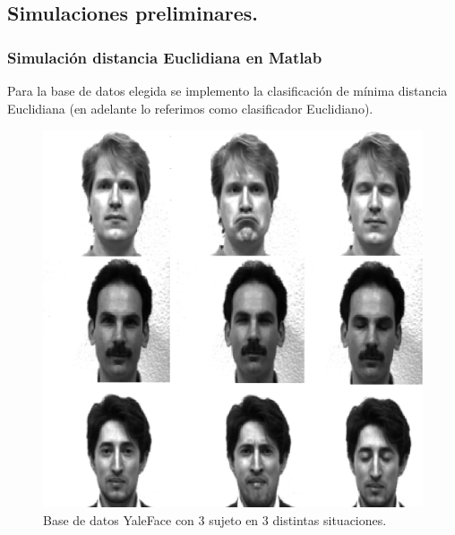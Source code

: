 \documentclass[letterpaper,12pt]{article}
\begin{document}
\subsection{Simulaciones preliminares.}
\subsubsection{Simulación distancia Euclidiana en Matlab}
Para la base de datos elegida se implemento la clasificación de mínima distancia Euclidiana (en adelante lo referimos como clasificador Euclidiano).
\begin{figure}[H]
\centering
\includegraphics[scale=0.3,keepaspectratio=true]{Figs/BasedeDatosEu.png}
\caption{Base de datos YaleFace con 3 sujeto en 3 distintas situaciones.}
\label{Fig:BasedeDatos}
\end{figure}
\end{document}
